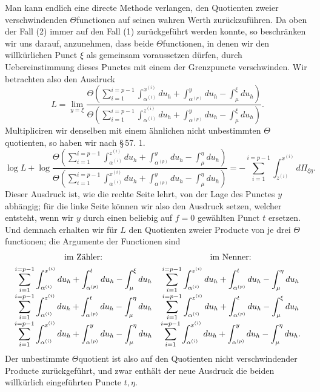 \documentclass[10pt]{article}
\begin{document}
Man kann endlich eine directe Methode verlangen, den Quotienten zweier verschwindenden \(\Theta\)functionen auf seinen wahren Werth zurückzuführen. Da oben der Fall (2) immer auf den Fall (1) zurückgeführt werden konnte, so beschränken wir uns darauf, anzunehmen, dass beide \(\Theta\)functionen, in denen wir den willkürlichen Punct \(\xi\) als gemeinsam voraussetzen dürfen, durch Uebereinstimmung dieses Punctes mit einem der Grenzpuncte verschwinden. Wir betrachten also den Ausdruck
\[
L=\lim_{y=\xi}
\frac{\Theta\left(\sum_{i=1}^{i=p-1}\int_{\alpha^{(i)}}^{x^{(i)}}du_h+
\int_{\alpha^{(p)}}^{y}du_h-\int_{\mu}^{\xi}du_h\right)}
{\Theta\left(\sum_{i=1}^{i=p-1}\int_{\alpha^{(i)}}^{z^{(i)}}du_h+
\int_{\alpha^{(p)}}^{y}du_h-\int_{\mu}^{\xi}du_h\right)}.
\]
Multipliciren wir denselben mit einem ähnlichen nicht unbestimmten \(\Theta\)quotienten, so haben wir nach \S\,57. 1.
\[
\log L+
\log\frac{\Theta\left(\sum_{i=1}^{i=p-1}\int_{\alpha^{(i)}}^{z^{(i)}}du_h+
\int_{\alpha^{(p)}}^{y}du_h-\int_{\mu}^{\eta}du_h\right)}
{\Theta\left(\sum_{i=1}^{i=p-1}\int_{\alpha^{(i)}}^{x^{(i)}}du_h+
\int_{\alpha^{(p)}}^{y}du_h-\int_{\mu}^{\eta}du_h\right)}
= -\sum_{i=1}^{i=p-1}\int_{z^{(i)}}^{x^{(i)}}d\Pi_{\xi\eta}.
\]
Dieser Ausdruck ist, wie die rechte Seite lehrt, von der Lage des Punctes \(y\) abhängig; für die linke Seite können wir also den Ausdruck setzen, welcher entsteht, wenn wir \(y\) durch einen beliebig auf \(f=0\) gewählten Punct \(t\) ersetzen. Und demnach erhalten wir für \(L\) den Quotienten zweier Producte von je drei \(\Theta\)functionen; die Argumente der Functionen sind
\[
\begin{array}{c@{\quad}c}
\text{im Zähler:} & \text{im Nenner:}\\[0.4em]
\displaystyle \sum_{i=1}^{i=p-1}\int_{\alpha^{(i)}}^{x^{(i)}}du_h+\int_{\alpha^{(p)}}^{t}du_h-\int_{\mu}^{\xi}du_h
&
\displaystyle \sum_{i=1}^{i=p-1}\int_{\alpha^{(i)}}^{z^{(i)}}du_h+\int_{\alpha^{(p)}}^{t}du_h-\int_{\mu}^{\eta}du_h
\\[1.0em]
\displaystyle \sum_{i=1}^{i=p-1}\int_{\alpha^{(i)}}^{z^{(i)}}du_h+\int_{\alpha^{(p)}}^{t}du_h-\int_{\mu}^{\eta}du_h
&
\displaystyle \sum_{i=1}^{i=p-1}\int_{\alpha^{(i)}}^{z^{(i)}}du_h+\int_{\alpha^{(p)}}^{t}du_h-\int_{\mu}^{\xi}du_h
\\[1.0em]
\displaystyle \sum_{i=1}^{i=p-1}\int_{\alpha^{(i)}}^{x^{(i)}}du_h+\int_{\alpha^{(p)}}^{y}du_h-\int_{\mu}^{\eta}du_h
&
\displaystyle \sum_{i=1}^{i=p-1}\int_{\alpha^{(i)}}^{x^{(i)}}du_h+\int_{\alpha^{(p)}}^{y}du_h-\int_{\mu}^{\eta}du_h .
\end{array}
\]
Der unbestimmte \(\Theta\)quotient ist also auf den Quotienten nicht verschwindender Producte zurückgeführt, und zwar enthält der neue Ausdruck die beiden willkürlich eingeführten Puncte \(t,\eta\).
\end{document}
